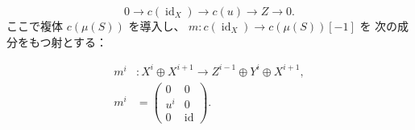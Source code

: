 \[
0\longrightarrow c(\operatorname{id}_X)\longrightarrow c(u)
\longrightarrow Z\longrightarrow0.
\]
ここで複体 $c(\mu(S))$ を導入し、
$m\colon c(\operatorname{id}_X)\longrightarrow c(\mu(S))[-1]$ を
次の成分をもつ射とする：

\begin{equation}
\begin{aligned}
m^i&\colon X^i\oplus X^{i+1}
  \longrightarrow Z^{i-1}\oplus Y^i\oplus X^{i+1},\\[2pt]
m^i&=
\begin{pmatrix}
0&0\\
u^i&0\\
0&\operatorname{id}
\end{pmatrix}.
\end{aligned}
\tag{1.3.2.2}
\end{equation}
\endgroup
